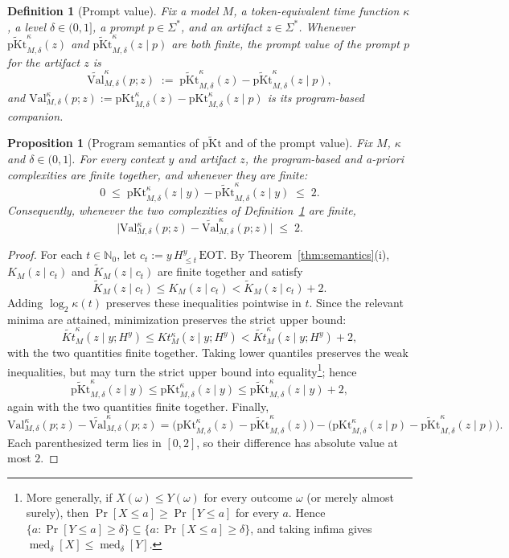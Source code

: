 \documentclass[10pt,a4paper]{amsart}
\newtheorem{definition}{Definition}
\newtheorem{proposition}{Proposition}
\newcommand{\EOT}{\mathrm{EOT}}
\newcommand{\Val}{\mathrm{Val}}
\DeclareMathOperator{\med}{med}
\newcommand{\pKt}{\mathrm{pKt}}
\newcommand{\pKtt}{\widetilde{\pKt}}
\begin{document}
\begin{definition}[Prompt value]\label{def:medval}
Fix a model $M$, a token-equivalent time function $\kappa$, a level
$\delta\in(0,1]$, a prompt $p\in\Sigma^*$, and an artifact $z\in\Sigma^*$. Whenever
$\pKtt^{\kappa}_{M,\delta}(z)$ and $\pKtt^{\kappa}_{M,\delta}(z \mid p)$ are
both finite, the \emph{prompt value} of the prompt $p$ for the artifact $z$
is
\begin{equation}\label{eq:valdef}
\widetilde{\Val}^{\kappa}_{M,\delta}(p; z) \;:=\;
\pKtt^{\kappa}_{M,\delta}(z) - \pKtt^{\kappa}_{M,\delta}(z \mid p) ,
\end{equation}
and $\Val^{\kappa}_{M,\delta}(p;z) := \pKt^{\kappa}_{M,\delta}(z)
- \pKt^{\kappa}_{M,\delta}(z \mid p)$ is its program-based companion. 
\end{definition}

\begin{proposition}[Program semantics of $\pKtt$ and of the prompt value]
\label{prop:pkt-semantics}
Fix $M$, $\kappa$ and $\delta\in(0,1]$. For every context $y$ and artifact $z$, the
program-based and a-priori complexities are finite together, and whenever they are finite:
\[
0 \;\le\; \pKt^{\kappa}_{M,\delta}(z \mid y)
- \pKtt^{\kappa}_{M,\delta}(z \mid y) \;\le\; 2 .
\]
Consequently, whenever the two complexities of Definition~\ref{def:medval} are
finite,
\[
\bigl| \Val^{\kappa}_{M,\delta}(p;z)
- \widetilde{\Val}^{\kappa}_{M,\delta}(p;z) \bigr| \;\le\; 2 .
\]
\end{proposition}

\begin{proof}
For each \(t\in\mathbb N_0\), let
\(c_t:=y\,H^y_{\leq t}\,\EOT\). By
Theorem~\ref{thm:semantics}(i), \(K_M(z\mid c_t)\) and
\(\widetilde K_M(z\mid c_t)\) are finite together and satisfy
\[
\widetilde K_M(z\mid c_t)
\leq K_M(z\mid c_t)
< \widetilde K_M(z\mid c_t)+2.
\]
Adding \(\log_2\kappa(t)\) preserves these inequalities pointwise in \(t\).
Since the relevant minima are attained, minimization preserves the strict
upper bound:
\[
\widetilde{Kt}^{\kappa}_M(z\mid y;H^y)
\leq Kt^{\kappa}_M(z\mid y;H^y)
< \widetilde{Kt}^{\kappa}_M(z\mid y;H^y)+2,
\]
with the two quantities finite together. Taking lower quantiles preserves the
weak inequalities, but may turn the strict upper bound into equality\footnote{More generally, if \(X(\omega)\leq Y(\omega)\) for every outcome
\(\omega\) (or merely almost surely), then
\(\Pr[X\leq a]\geq\Pr[Y\leq a]\) for every \(a\). Hence
\(\{a:\Pr[Y\leq a]\geq\delta\}\subseteq
\{a:\Pr[X\leq a]\geq\delta\}\), and taking infima gives
\(\med_\delta[X]\leq\med_\delta[Y]\).}; hence
\[
\pKtt^{\kappa}_{M,\delta}(z\mid y)
\leq \pKt^{\kappa}_{M,\delta}(z\mid y)
\leq \pKtt^{\kappa}_{M,\delta}(z\mid y)+2,
\]
again with the two quantities finite together. Finally,
\[
\Val^\kappa_{M,\delta}(p;z)
-\widetilde{\Val}^\kappa_{M,\delta}(p;z)
=
\bigl(
\pKt^\kappa_{M,\delta}(z)
-\pKtt^\kappa_{M,\delta}(z)
\bigr)
-
\bigl(
\pKt^\kappa_{M,\delta}(z\mid p)
-\pKtt^\kappa_{M,\delta}(z\mid p)
\bigr).
\]
Each parenthesized term lies in \([0,2]\), so their difference has absolute
value at most \(2\).
\end{proof}
\end{document}
